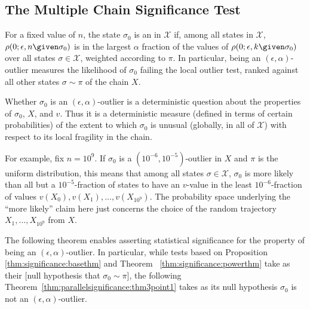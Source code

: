 \documentclass[12pt]{article}
\begin{document}
\subsection*{The Multiple Chain Significance Test}

\begin{definition}
    For a fixed value of \( n \), the state \( \sigma_0 \) is an  in \( \mathcal{X} \) if, among all
    states in \( \mathcal{X} \), \( \rho(0; \epsilon, n \given \sigma_{0})
    \) is in the largest \( \alpha \) fraction of the values of \( \rho(0;
    \epsilon, k \given \sigma_{0}) \) over all states \( \sigma \in
    \mathcal{X} \), weighted according to \( \pi \).  In particular,
    being an \( (\epsilon, \alpha) \)-outlier measures the likelihood of
    \( \sigma_0 \) failing the local outlier test, ranked against all
    other states \( \sigma \sim \pi \) of the chain \( X \).
\end{definition}

Whether \( \sigma_0 \) is an \( (\epsilon, \alpha) \)-outlier is a
deterministic question about the properties of \( \sigma_0 \), \( X \),
and \( v \).  Thus it is a deterministic measure (defined in terms of
certain probabilities) of the extent to which \( \sigma_0 \) is unusual
(globally, in all of \( \mathcal{X} \)) with respect to its local
fragility in the chain.

\begin{example}
    For example, fix \( n = 10^9 \).  If \( \sigma_0 \) is a \( (10^{-6},
    10^{-5}) \)-outlier in \( X \) and \( \pi \) is the uniform
    distribution, this means that among all states \( \sigma \in
    \mathcal{X} \), \( \sigma_0 \) is more likely than all but a \( 10^{-5}
    \)-fraction of states to have an \( v \)-value in the least \( 10^{-6}
    \)-fraction of values \( v(X_0), v(X_1 ), \dots , v(X_{10^9} ) \).
    The probability space underlying the ``more likely'' claim here just
    concerns the choice of the random trajectory \( X_1, \dots, X_{10^9}
    \) from \( X \).
\end{example}

The following theorem enables asserting statistical significance for the
property of being an \( (\epsilon, \alpha) \)-outlier.  In particular,
while tests based on Proposition~%
\ref{thm:significance:basethm} and Theorem~%
\ref{thm:significance:powerthm} take as their [null hypothesis that \(
\sigma_0 \sim \pi \)], the following
Theorem~\ref{thm:parallelsignificance:thm3point1}
takes as its null hypothesis
\( \sigma_{0} \) is not an \( (\epsilon, \alpha) \)-outlier.
\end{document}
